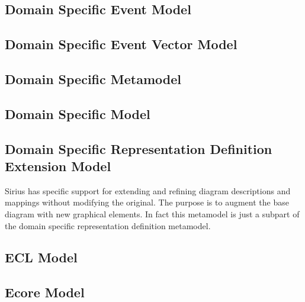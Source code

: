\documentclass{gemoc} %
\begin{document}
\subsection{Domain Specific Event Model}


\subsection{Domain Specific Event Vector Model}


\subsection{Domain Specific Metamodel}


\subsection{Domain Specific Model}


\subsection{Domain Specific Representation Definition Extension Model}
Sirius has specific support for extending and refining diagram descriptions and mappings without modifying the original. The purpose is to augment the base diagram with new graphical elements. In fact this metamodel is just a subpart of the domain specific representation definition metamodel.

\subsection{ECL Model}


\subsection{Ecore Model}
\end{document}
